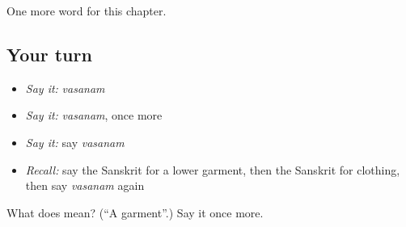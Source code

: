 \begin{grammarlens}[title={What you've built}]
One more word for this chapter.
\end{grammarlens}

\subsection*{Your turn}
\begin{itemize}
\raggedright
  \item \emph{Say it:} \emph{vasanam}
  \item \emph{Say it:} \emph{vasanam}, once more
  \item \emph{Say it:} say \emph{vasanam}
  \item \emph{Recall:} say the Sanskrit for a lower garment, then the Sanskrit for clothing, then say \emph{vasanam} again
\end{itemize}

\begin{tcolorbox}[breakable,colback=teal!4,colframe=teal!35!black,title={Before you move on}]
What does  mean? (\textquotedblleft{}A garment\textquotedblright{}.) Say it once more.
\end{tcolorbox}
